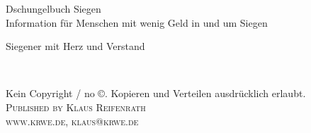 \documentclass[11pt,fleqn]{book} %
\begin{document}

\begingroup
\thispagestyle{empty}
\centering
\vspace*{9cm}
\par\normalfont\fontsize{35}{35}\sffamily\selectfont
Dschungelbuch Siegen\\ {\LARGE Information für Menschen mit wenig Geld in und um Siegen}\par %
\vspace*{1cm}
{\Huge Siegener mit Herz und Verstand}\par %
\endgroup


\newpage
~\vfill
\thispagestyle{empty}

\noindent Kein Copyright / no \copyright. Kopieren und Verteilen ausdrücklich erlaubt.\\ %

\noindent \textsc{Published by Klaus Reifenrath}\\ %

\noindent \textsc{www.krwe.de, klaus@krwe.de}\\ %



\end{document}
